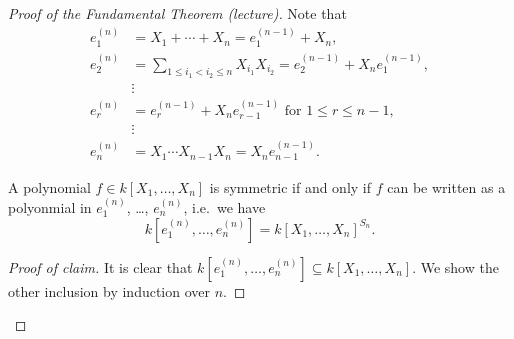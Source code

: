 \begin{proof}[Proof of the Fundamental Theorem (lecture)]
 Note that
 \begin{align*}
  e^{(n)}_1 &= X_1 + \dotsb + X_n = e_1^{(n-1)} + X_n, \\
  e^{(n)}_2 &= \sum_{1 \leq i_1 < i_2 \leq n} X_{i_1} X_{i_2} = e_2^{(n-1)} + X_n e_1^{(n-1)}, \\
            &\vdots \tag{$\ast$}\\ 
  e^{(n)}_r &= e^{(n-1)}_r + X_n e^{(n-1)}_{r-1} \text{ for } 1 \leq r \leq n-1, \\
            &\vdots \\
  e^{(n)}_n &= X_1 \dotsm X_{n-1} X_n = X_n e^{(n-1)}_{n-1}.
 \end{align*}
 \begin{claim}
  A polynomial $f \in k[X_1, \dotsc, X_n]$ is symmetric if and only if $f$ can be written as a polyonmial in $e^{(n)}_1$, \dots, $e^{(n)}_n$, i.e.\ we have
  \[
   k\left[e^{(n)}_1, \dotsc, e^{(n)}_n\right] = k[X_1, \dotsc, X_n]^{S_n}.
  \]
 \end{claim}
 \begin{proof}[Proof of claim]
  It is clear that $k\left[e^{(n)}_1, \dotsc, e^{(n)}_n\right] \subseteq k[X_1, \dotsc, X_n]$. We show the other inclusion by induction over $n$.
  

\end{proof}
\end{proof}
